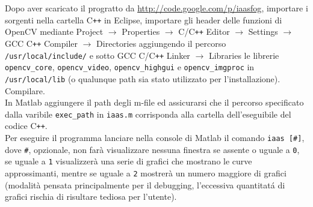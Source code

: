 \documentclass[12pt]{report}
\begin{document}
\noindent Dopo aver scaricato il progratto da \url{http://code.google.com/p/iaasfog}, importare i sorgenti nella cartella C\verb|++| in Eclipse, importare gli header delle funzioni di OpenCV mediante Project $\rightarrow$ Properties  $\rightarrow$ C\slash C\verb|++| Editor $\rightarrow$ Settings $\rightarrow$ GCC C\verb|++| Compiler $\rightarrow$ Directories aggiungendo il percorso \verb|/usr/local/include/| e sotto GCC C\slash C\verb|++| Linker $\rightarrow$ Libraries le librerie \verb|opencv_core|, \verb|opencv_video|, \verb|opencv_highgui| e \verb|opencv_imgproc| in \verb|/usr/local/lib| (o qualunque path sia stato utilizzato per l'installazione).\\
Compilare.\\

\noindent In Matlab aggiungere il path degli m-file ed assicurarsi che il percorso specificato dalla varibile \verb|exec_path| in \verb|iaas.m| corrisponda alla cartella dell'eseguibile del codice C\verb|++|.\\
Per eseguire il programma lanciare nella console di Matlab il comando \verb|iaas [#]|, dove \verb|#|, opzionale, non far\`a visualizzare nessuna finestra se assente o uguale a \verb|0|, se uguale a \verb|1| visualizzer\`a una serie di grafici che mostrano le curve approssimanti, mentre se uguale a \verb|2| mostrer\`a un numero maggiore di grafici (modalit\`a pensata principalmente per il debugging, l'eccessiva quantitat\'a di grafici rischia di risultare tediosa per l'utente).

\end{document}
